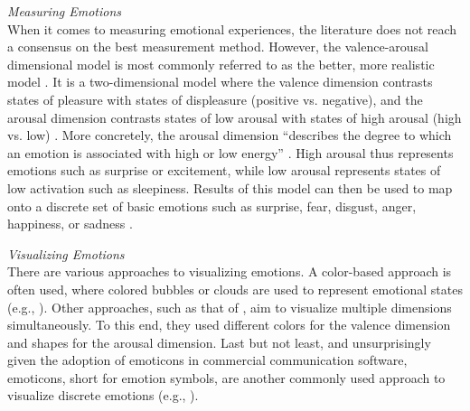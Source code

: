 \medskip\noindent\textit{Measuring Emotions}\\
When it comes to measuring emotional experiences, the literature does not reach a consensus on the best measurement method. However, the valence-arousal dimensional model is most commonly referred to as the better, more realistic model \autocite{russell1980circumplex, mauss2009measures}. It is a two-dimensional model where the valence dimension contrasts states of pleasure with states of displeasure (positive vs. negative), and the arousal dimension contrasts states of low arousal with states of high arousal (high vs. low) \autocite{mauss2009measures}. More concretely, the arousal dimension \enquote{describes the degree to which an emotion is associated with high or low energy} \autocite[p.~1334]{tseng2014using}. High arousal thus represents emotions such as surprise or excitement, while low arousal represents states of low activation such as sleepiness. Results of this model can then be used to map onto a discrete set of basic emotions such as surprise, fear, disgust, anger, happiness, or sadness \autocite{brave2007emotion}.

\medskip\noindent\textit{Visualizing Emotions}\\
There are various approaches to visualizing emotions. A color-based approach is often used, where colored bubbles or clouds are used to represent emotional states (e.g., \autocite{church2010study, kempter2014emotionwatch, guzman2013visualizing}). Other approaches, such as that of \textcite{mcduff2012affectaura}, aim to visualize multiple dimensions simultaneously. To this end, they used different colors for the valence dimension and shapes for the arousal dimension. Last but not least, and unsurprisingly given the adoption of emoticons in commercial communication software, emoticons, short for emotion symbols, are another commonly used approach to visualize discrete emotions (e.g., \autocite{garcia1999emotional, sanchez2006conveying}).